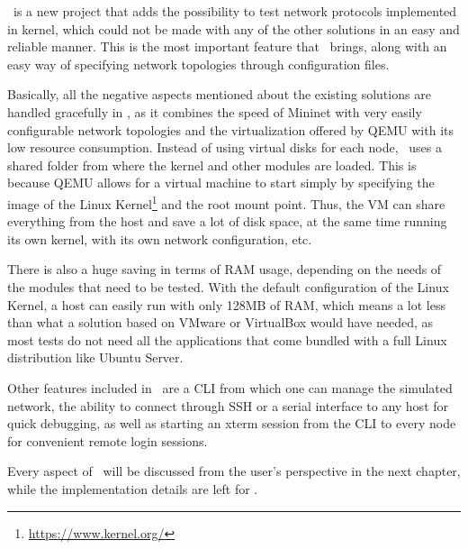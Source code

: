 \project\ is a new project that adds the possibility to test network protocols implemented in kernel, which could not be made with any of the other solutions in an easy and reliable manner.
This is the most important feature that \project\ brings, along with an easy way of specifying network topologies through configuration files.

Basically, all the negative aspects mentioned about the existing solutions are handled gracefully in \project, as it combines the speed of Mininet with very easily configurable network topologies and the virtualization offered by QEMU with its low resource consumption.
Instead of using virtual disks for each node, \project\ uses a shared folder from where the kernel and other modules are loaded.
This is because QEMU allows for a virtual machine to start simply by specifying the image of the Linux Kernel\footnote{\url{https://www.kernel.org/}} and the root mount point.
Thus, the VM can share everything from the host and save a lot of disk space, at the same time running its own kernel, with its own network configuration, etc.

There is also a huge saving in terms of RAM usage, depending on the needs of the modules that need to be tested.
With the default configuration of the Linux Kernel, a host can easily run with only 128MB of RAM, which means a lot less than what a solution based on VMware or VirtualBox would have needed, as most tests do not need all the applications that come bundled with a full Linux distribution like Ubuntu Server.

Other features included in \project\ are a CLI from which one can manage the simulated network, the ability to connect through SSH or a serial interface to any host for quick debugging, as well as starting an xterm session from the CLI to every node for convenient remote login sessions.

Every aspect of \project\ will be discussed from the user's perspective in the next chapter, while the implementation details are left for .
